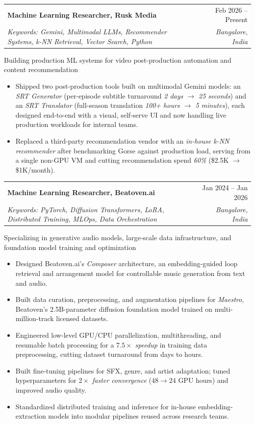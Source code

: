 \documentclass[a4paper,margin=0.5in,10pt]{article}
\makeatletter
\newenvironment{joblong}[5] %
    {
    \begin{tabularx}{\linewidth}{@{}l X r@{}}
        \textbf{#1} & \hfill &  #2 \\[3.75pt]
        \small{\textit{#3}} & \hfill & \textit{#4} \\[3.75pt]    
    \end{tabularx}
    \begin{minipage}[t]{\linewidth}
    {#5}
    \begin{itemize}[nosep,after=\strut, leftmargin=2em, itemsep=3pt]
    }
    {
    \end{itemize}
    \end{minipage}    
    }
\makeatother
\begin{document}
\begin{joblong}{Machine Learning Researcher, Rusk Media}{Feb 2026 – Present}
    {Keywords: Gemini, Multimodal LLMs, Recommender Systems, k-NN Retrieval, Vector Search, Python}{Bangalore, India}
    {Building production ML systems for video post-production automation and content recommendation}
    \item Shipped two post-production tools built on multimodal Gemini models: an \textit{SRT Generator} (per-episode subtitle turnaround \textit{2 days $\rightarrow$ 25 seconds}) and an \textit{SRT Translator} (full-season translation \textit{100+ hours $\rightarrow$ 5 minutes}), each designed end-to-end with a visual, self-serve UI and now handling live production workloads for internal teams.
    \item Replaced a third-party recommendation vendor with an \textit{in-house k-NN recommender} after benchmarking Gorse against production load, serving from a single non-GPU VM and cutting recommendation spend \textit{60\%} (\$2.5K $\rightarrow$ \$1K/month).
\end{joblong}


\begin{joblong}{Machine Learning Researcher, Beatoven.ai}{Jan 2024 – Jan 2026}
    {Keywords: PyTorch, Diffusion Transformers, LoRA, Distributed Training, MLOps, Data Orchestration}{Bangalore, India}
    {Specializing in generative audio models, large-scale data infrastructure, and foundation model training and optimization}
    \item Designed Beatoven.ai's \textit{Composer} architecture, an embedding-guided loop retrieval and arrangement model for controllable music generation from text and audio.
    \item Built data curation, preprocessing, and augmentation pipelines for \textit{Maestro}, Beatoven's 2.5B-parameter diffusion foundation model trained on multi-million-track licensed datasets.
    \item Engineered low-level GPU/CPU parallelization, multithreading, and resumable batch processing for a \textit{$7.5\times$ speedup} in training data preprocessing, cutting dataset turnaround from days to hours.
    \item Built fine-tuning pipelines for SFX, genre, and artist adaptation; tuned hyperparameters for \textit{$2\times$ faster convergence} ($48\rightarrow 24$ GPU hours) and improved audio quality.
    \item Standardized distributed training and inference for in-house embedding-extraction models into modular pipelines reused across research teams.
\end{joblong}
\end{document}
